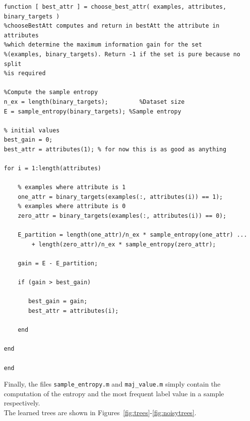 \documentclass{article}
\begin{document}
\begin{lstlisting}
function [ best_attr ] = choose_best_attr( examples, attributes, binary_targets )
%chooseBestAtt computes and return in bestAtt the attribute in attributes
%which determine the maximum information gain for the set 
%(examples, binary_targets). Return -1 if the set is pure because no split
%is required

%Compute the sample entropy
n_ex = length(binary_targets);         %Dataset size
E = sample_entropy(binary_targets); %Sample entropy

% initial values
best_gain = 0;
best_attr = attributes(1); % for now this is as good as anything
    
for i = 1:length(attributes)
       
    % examples where attribute is 1
    one_attr = binary_targets(examples(:, attributes(i)) == 1); 
    % examples where attribute is 0
    zero_attr = binary_targets(examples(:, attributes(i)) == 0);
        
    E_partition = length(one_attr)/n_ex * sample_entropy(one_attr) ...
        + length(zero_attr)/n_ex * sample_entropy(zero_attr);
        
    gain = E - E_partition;
        
    if (gain > best_gain)
            
       best_gain = gain;
       best_attr = attributes(i);
        
    end
        
end

end

\end{lstlisting}
Finally, the files \verb$sample_entropy.m$ and \verb$maj_value.m$ simply contain the computation of the entropy and the most frequent label value in a sample respectively.\\
The learned trees are shown in Figures~\ref{fig:trees}-\ref{fig:noisytrees}.
\end{document}
